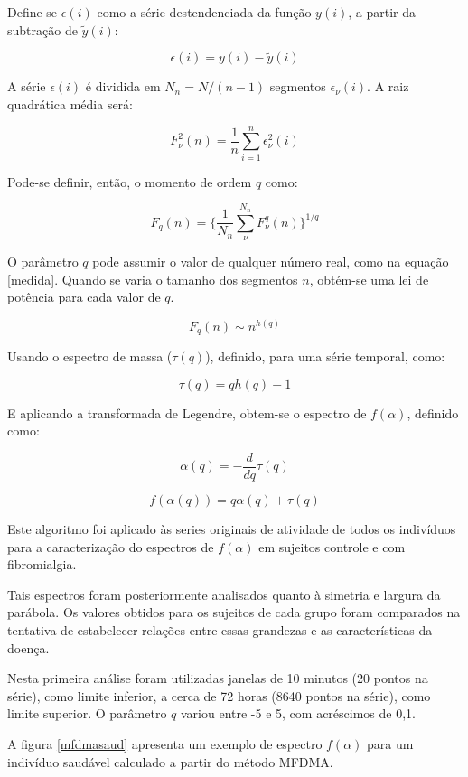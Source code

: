 \documentclass{ufscThesis}
\begin{document}
Define-se $\epsilon(i)$ como a série destendenciada da função $y(i)$, a partir da subtração de $\tilde{y}(i)$:

\begin{equation}
\epsilon(i) = y(i) - \tilde{y}(i)
\label{epsilon}
\end{equation}

A série $\epsilon(i)$ é dividida em $N_{n} = N/(n-1)$ segmentos $\epsilon_{\nu}(i)$. A raiz quadrática média será:

\begin{equation}
F_{\nu}^{2}(n) = \frac{1}{n} \sum_{i=1}^{n} \epsilon_{\nu}^{2}(i)
\label{rqm}
\end{equation}

Pode-se definir, então, o momento de ordem $q$ como:

\begin{equation}
F_{q}(n) = \bigg\{ \frac{1}{N_{n}} \sum_{\nu}^{N_{n}} F_{\nu}^{q}(n) \bigg\}^{1/q}
\label{parti}
\end{equation}

O parâmetro $q$ pode assumir o valor de qualquer número real, como na equação \ref{medida}. Quando se varia o tamanho dos segmentos $n$, obtém-se uma lei de potência para cada valor de $q$.

\begin{equation}
F_{q}(n) \sim n^{h(q)}
\end{equation}

Usando o espectro de massa ($\tau(q)$), definido, para uma série temporal, como:

\begin{equation}
\tau(q) = qh(q) - 1
\end{equation}

E aplicando a transformada de Legendre, obtem-se o espectro de $f(\alpha)$, definido como:

\begin{equation}
\alpha(q) = - \frac{d}{dq}\tau(q)
\end{equation}

\begin{equation}
f(\alpha(q)) = q\alpha(q) + \tau(q)
\end{equation}

Este algoritmo foi aplicado às series originais de atividade de todos os indivíduos para a caracterização do espectros de $f(\alpha)$ em sujeitos controle e com fibromialgia. \par
Tais espectros foram posteriormente analisados quanto à simetria e largura da parábola. Os valores obtidos para os sujeitos de cada grupo foram comparados na tentativa de estabelecer relações entre essas grandezas e as características da doença. \par
Nesta primeira análise foram utilizadas janelas de 10 minutos (20 pontos na série), como limite inferior, a cerca de 72 horas (8640 pontos na série), como limite superior. O parâmetro $q$ variou entre -5 e 5, com acréscimos de 0,1.\par 
A figura \ref{mfdmasaud} apresenta um exemplo de espectro $f(\alpha)$ para um indivíduo saudável calculado a partir do método MFDMA.
\end{document}
